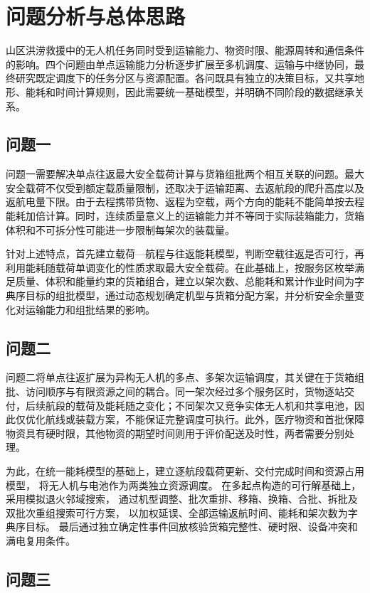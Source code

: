 \documentclass[bwprint]{gmcmthesis}
\begin{document}
\section{问题分析与总体思路}

山区洪涝救援中的无人机任务同时受到运输能力、物资时限、能源周转和通信条件的影响。四个问题由单点运输能力分析逐步扩展至多机调度、运输与中继协同，最终研究既定调度下的任务分区与资源配置。各问既具有独立的决策目标，又共享地形、能耗和时间计算规则，因此需要统一基础模型，并明确不同阶段的数据继承关系。

\subsection{问题一}

问题一需要解决单点往返最大安全载荷计算与货箱组批两个相互关联的问题。最大安全载荷不仅受到额定载质量限制，还取决于运输距离、去返航段的爬升高度以及返航电量下限。由于去程携带货物、返程为空载，两个方向的能耗不能简单按去程能耗加倍计算。同时，连续质量意义上的运输能力并不等同于实际装箱能力，货箱体积和不可拆分性可能进一步限制每架次的装载量。

针对上述特点，首先建立载荷—航程与往返能耗模型，判断空载往返是否可行，再利用能耗随载荷单调变化的性质求取最大安全载荷。在此基础上，按服务区枚举满足质量、体积和能量约束的货箱组合，建立以架次数、总能耗和累计作业时间为字典序目标的组批模型，通过动态规划确定机型与货箱分配方案，并分析安全余量变化对运输能力和组批结果的影响。

\subsection{问题二}

问题二将单点往返扩展为异构无人机的多点、多架次运输调度，其关键在于货箱组批、访问顺序与有限资源之间的耦合。同一架次经过多个服务区时，货物逐站交付，后续航段的载荷及能耗随之变化；不同架次又竞争实体无人机和共享电池，因此仅优化航线或装载方案，不能保证完整调度可执行。此外，医疗物资和首批保障物资具有硬时限，其他物资的期望时间则用于评价配送及时性，两者需要分别处理。

为此，在统一能耗模型的基础上，建立逐航段载荷更新、交付完成时间和资源占用模型，
将无人机与电池作为两类独立资源调度。
在多起点构造的可行解基础上，采用模拟退火邻域搜索，
通过机型调整、批次重排、移箱、换箱、合批、拆批及双批次重组搜索可行方案，
以加权延误、全部运输返航时间、能耗和架次数为字典序目标。
最后通过独立确定性事件回放核验货箱完整性、硬时限、设备冲突和满电复用条件。

\subsection{问题三}
\end{document}
